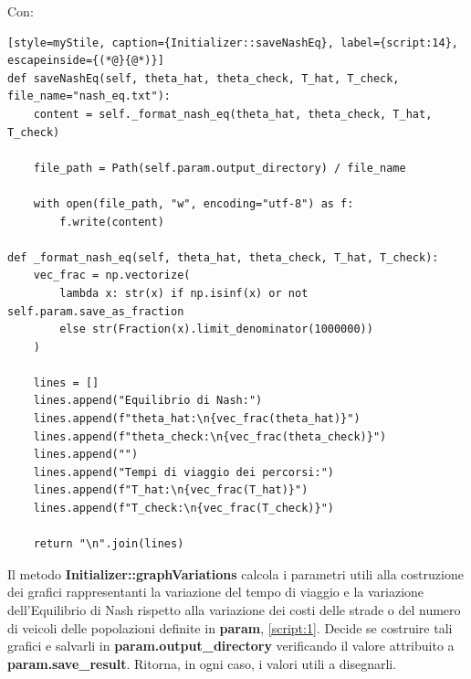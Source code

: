 Con: 

\begin{lstlisting}[style=myStile, caption={Initializer::saveNashEq}, label={script:14}, escapeinside={(*@}{@*)}]
def saveNashEq(self, theta_hat, theta_check, T_hat, T_check, file_name="nash_eq.txt"):
    content = self._format_nash_eq(theta_hat, theta_check, T_hat, T_check)

    file_path = Path(self.param.output_directory) / file_name

    with open(file_path, "w", encoding="utf-8") as f:
        f.write(content)

def _format_nash_eq(self, theta_hat, theta_check, T_hat, T_check):
    vec_frac = np.vectorize(
        lambda x: str(x) if np.isinf(x) or not self.param.save_as_fraction 
        else str(Fraction(x).limit_denominator(1000000))
    )

    lines = []
    lines.append("Equilibrio di Nash:")
    lines.append(f"theta_hat:\n{vec_frac(theta_hat)}")
    lines.append(f"theta_check:\n{vec_frac(theta_check)}")
    lines.append("")
    lines.append("Tempi di viaggio dei percorsi:")
    lines.append(f"T_hat:\n{vec_frac(T_hat)}")
    lines.append(f"T_check:\n{vec_frac(T_check)}")

    return "\n".join(lines)
\end{lstlisting}

Il metodo \textbf{Initializer::graphVariations} calcola i parametri utili alla costruzione dei grafici rappresentanti la variazione del tempo di 
viaggio e la variazione dell'Equilibrio di Nash rispetto alla variazione dei costi delle strade o del numero di veicoli delle 
popolazioni definite in \textbf{param}, \autoref{script:1}. Decide se costruire tali grafici e salvarli in \textbf{param.output\_directory}
verificando il valore attribuito a \textbf{param.save\_result}. Ritorna, in ogni caso, i valori utili a disegnarli.

